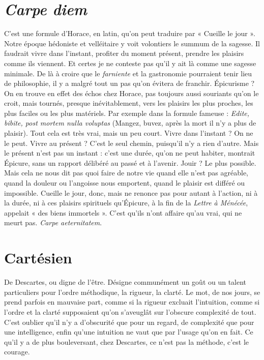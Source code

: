 \section{\it Carpe diem}
C’est une formule d'Horace, en latin, qu’on peut traduire
par « Cueille le jour ». Notre époque hédoniste et velléitaire
y voit volontiers le summum de la sagesse. Il faudrait vivre dans l’instant, profiter
du moment présent, prendre les plaisirs comme ils viennent. Et certes je
ne conteste pas qu'il y ait là comme une sagesse minimale. De là à croire que le
{\it farniente} et la gastronomie pourraient tenir lieu de philosophie, il y a malgré
tout un pas qu’on évitera de franchir. Épicurisme ? On en trouve en effet des
échos chez Horace, pas toujours aussi souriants qu’on le croit, mais tournés,
presque inévitablement, vers les plaisirs les plus proches, les plus faciles ou les
plus matériels. Par exemple dans la formule fameuse : {\it Edite, bibite, post mortem
nulla voluptas} (Mangez, buvez, après la mort il n’y a plus de plaisir). Tout cela
est très vrai, mais un peu court. Vivre dans l’instant ? On ne le peut. Vivre au
présent ? C’est le seul chemin, puisqu’il n’y a rien d’autre. Mais le présent n’est
pas un instant : c’est une durée, qu’on ne peut habiter, montrait Épicure, sans
un rapport délibéré au passé et à l'avenir. Jouir ? Le plus possible. Mais cela ne
nous dit pas quoi faire de notre vie quand elle n’est pas agréable, quand la douleur
ou l'angoisse nous emportent, quand le plaisir est différé ou impossible.
Cueille le jour, donc, mais ne renonce pas pour autant à l’action, ni à la durée,
ni à ces plaisirs spirituels qu’Épicure, à la fin de la {\it Lettre à Ménécée}, appelait
« des biens immortels ». C’est qu'ils n’ont affaire qu’au vrai, qui ne meurt pas.
{\it Carpe aeternitatem}.

\section{Cartésien}
De Descartes, ou digne de l’être. Désigne communément un
goût ou un talent particuliers pour l’ordre méthodique, la
rigueur, la clarté. Le mot, de nos jours, se prend parfois en mauvaise part,
comme si la rigueur excluait l'intuition, comme si l’ordre et la clarté supposaient
qu’on s’aveuglât sur l’obscure complexité de tout. C’est oublier qu’il n’y
a d’obscurité que pour un regard, de complexité que pour une intelligence,
enfin qu’une intuition ne vaut que par l’usage qu’on en fait. Ce qu’il y a de plus
bouleversant, chez Descartes, ce n’est pas la méthode, c’est le courage.

